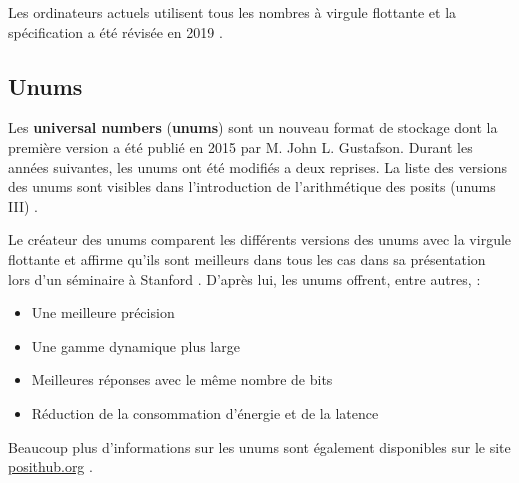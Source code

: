 Les ordinateurs actuels utilisent tous les nombres à virgule flottante et la spécification a été révisée en 2019 \cite{ieee-754-2019}.

\subsection{Unums}

Les \textbf{universal numbers} (\textbf{unums}) sont un nouveau format de stockage dont la première version a été publié en 2015 par M. John L. Gustafson. Durant les années suivantes, les unums ont été modifiés a deux reprises. La liste des versions des unums sont visibles dans l'introduction de l'arithmétique des posits (unums III) \cite{posit-arithmetic}.

Le créateur des unums comparent les différents versions des unums avec la virgule flottante et affirme qu'ils sont meilleurs dans tous les cas dans sa présentation lors d'un séminaire à Stanford \cite{youtube-beyond-floating-point}. D'après lui, les unums offrent, entre autres, :

\begin{itemize}
    \item Une meilleure précision
    \item Une gamme dynamique plus large
    \item Meilleures réponses avec le même nombre de bits
    \item Réduction de la consommation d'énergie et de la latence
\end{itemize}

Beaucoup plus d'informations sur les unums sont également disponibles sur le site \url{posithub.org} \cite{posithub}.

